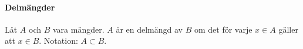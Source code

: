 \paragraph{Delmängder}

Låt $A$ och $B$ vara mängder. $A$ är en delmängd av $B$ om det för varje $x \in A$ gäller att $x \in B$. Notation: $A \subset B$.